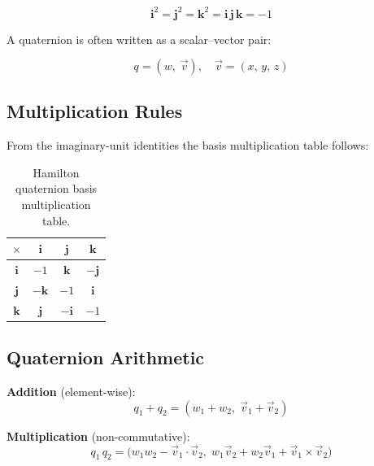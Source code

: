 \documentclass[12pt,a4paper]{article}
\begin{document}
\begin{equation}
  \mathbf{i}^2 = \mathbf{j}^2 = \mathbf{k}^2
  = \mathbf{i}\,\mathbf{j}\,\mathbf{k} = -1
\end{equation}

A quaternion is often written as a scalar--vector pair:

\begin{equation}
  q = (w,\;\vec{v}), \quad \vec{v} = (x,\,y,\,z)
\end{equation}

\subsection{Multiplication Rules}

From the imaginary-unit identities the basis multiplication table follows:

\begin{table}[h]
\centering
\begin{tabular}{@{}c|ccc@{}}
\toprule
$\times$ & $\mathbf{i}$ & $\mathbf{j}$ & $\mathbf{k}$ \\
\midrule
$\mathbf{i}$ & $-1$ & $\mathbf{k}$  & $-\mathbf{j}$ \\
$\mathbf{j}$ & $-\mathbf{k}$ & $-1$ & $\mathbf{i}$  \\
$\mathbf{k}$ & $\mathbf{j}$  & $-\mathbf{i}$ & $-1$ \\
\bottomrule
\end{tabular}
\caption{Hamilton quaternion basis multiplication table.}
\end{table}

\subsection{Quaternion Arithmetic}

\textbf{Addition} (element-wise):
\begin{equation}
  q_1 + q_2 = (w_1+w_2,\;\vec{v}_1+\vec{v}_2)
\end{equation}

\textbf{Multiplication} (non-commutative):
\begin{equation}
  q_1\,q_2 = \bigl(w_1 w_2 - \vec{v}_1\cdot\vec{v}_2,\;
              w_1\vec{v}_2 + w_2\vec{v}_1
              + \vec{v}_1\times\vec{v}_2\bigr)
\end{equation}
\end{document}
